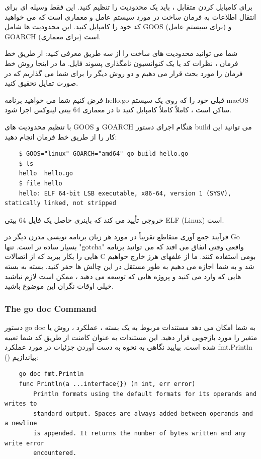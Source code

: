 \documentclass[12pt]{book}
\begin{document}
برای کامپایل کردن متقابل ، باید یک محدودیت را تنظیم کنید.
این فقط وسیله ای برای انتقال اطلاعات به فرمان ساخت در مورد سیستم عامل و معماری است که می خواهید کد خود را کامپایل کنید.
این محدودیت ها شامل GOOS (برای سیستم عامل) و GOARCH (برای معماری) است.

شما می توانید محدودیت های ساخت را از سه طریق معرفی کنید: از طریق خط فرمان ، نظرات کد یا یک کنوانسیون نامگذاری پسوند فایل.
ما در اینجا روش خط فرمان را مورد بحث قرار می دهیم و دو روش دیگر را برای شما می گذاریم که در صورت تمایل تحقیق کنید.

فرض کنیم شما می خواهید برنامه hello.go قبلی خود را که روی یک سیستم macOS ساکن است ، کاملاً کاملاً کامپایل کنید تا در معماری 64 بیتی لینوکس اجرا شود.

با تنظیم محدودیت های GOOS و GOARCH هنگام اجرای دستور build می توانید این کار را از طریق خط فرمان انجام دهید:
\begin{latin}
	\begin{lstlisting}
	$ GOOS="linux" GOARCH="amd64" go build hello.go
	$ ls
	hello  hello.go
	$ file hello
	hello: ELF 64-bit LSB executable, x86-64, version 1 (SYSV), statically linked, not stripped
	\end{lstlisting}
\end{latin}

خروجی تأیید می کند که باینری حاصل یک فایل 64 بیتی ELF (Linux) است.

فرآیند جمع آوری متقاطع تقریباً در مورد هر زبان برنامه نویسی مدرن دیگر در Go بسیار ساده تر است.
تنها "gotcha" واقعی وقتی اتفاق می افتد که می توانید برنامه هایی را بکار ببرید که از اتصالات C بومی استفاده کنند.
ما از علفهای هرز خارج خواهیم شد و به شما اجازه می دهیم به طور مستقل در این چالش ها حفر کنید.
بسته به بسته هایی که وارد می کنید و پروژه هایی که توسعه می دهید ، ممکن است لازم نباشید خیلی اوقات نگران این موضوع باشید.
\subsubsection{The go doc Command}
دستور go doc به شما امکان می دهد مستندات مربوط به یک بسته ، عملکرد ، روش یا متغیر را مورد بازجویی قرار دهید.
این مستندات به عنوان کامنت از طریق کد شما تعبیه شده است.
بیایید نگاهی به نحوه به دست آوردن جزئیات در مورد عملکرد fmt.Println () بیاندازیم:
\begin{latin}
	\begin{lstlisting}
	go doc fmt.Println
	func Println(a ...interface{}) (n int, err error)
		Println formats using the default formats for its operands and writes to
		standard output. Spaces are always added between operands and a newline
		is appended. It returns the number of bytes written and any write error
		encountered.
	\end{lstlisting}
\end{latin}
\end{document}
